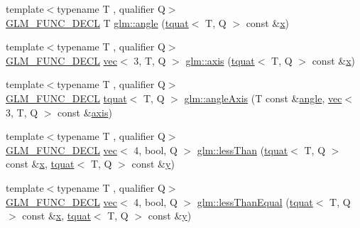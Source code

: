 \begin{DoxyCompactItemize}
\item 
{\footnotesize template$<$typename T , qualifier Q$>$ }\\\hyperlink{setup_8hpp_ab2d052de21a70539923e9bcbf6e83a51}{G\+L\+M\+\_\+\+F\+U\+N\+C\+\_\+\+D\+E\+CL} T \hyperlink{group__gtc__quaternion_gaaee6c856cae3217d274a240238cb6373}{glm\+::angle} (\hyperlink{structglm_1_1tquat}{tquat}$<$ T, Q $>$ const \&\hyperlink{_s_d_l__opengl_8h_ad0e63d0edcdbd3d79554076bf309fd47}{x})
\item 
{\footnotesize template$<$typename T , qualifier Q$>$ }\\\hyperlink{setup_8hpp_ab2d052de21a70539923e9bcbf6e83a51}{G\+L\+M\+\_\+\+F\+U\+N\+C\+\_\+\+D\+E\+CL} \hyperlink{structglm_1_1vec}{vec}$<$ 3, T, Q $>$ \hyperlink{group__gtc__quaternion_gaaf2707d3081789ce097daaa6e54d5287}{glm\+::axis} (\hyperlink{structglm_1_1tquat}{tquat}$<$ T, Q $>$ const \&\hyperlink{_s_d_l__opengl_8h_ad0e63d0edcdbd3d79554076bf309fd47}{x})
\item 
{\footnotesize template$<$typename T , qualifier Q$>$ }\\\hyperlink{setup_8hpp_ab2d052de21a70539923e9bcbf6e83a51}{G\+L\+M\+\_\+\+F\+U\+N\+C\+\_\+\+D\+E\+CL} \hyperlink{structglm_1_1tquat}{tquat}$<$ T, Q $>$ \hyperlink{group__gtc__quaternion_ga93856b8bfcdd5b9a164248df3149476c}{glm\+::angle\+Axis} (T const \&\hyperlink{_s_d_l__opengl__glext_8h_a9e06c1f76a20fed54ca742cd25cb02c4}{angle}, \hyperlink{structglm_1_1vec}{vec}$<$ 3, T, Q $>$ const \&\hyperlink{group__gtc__quaternion_gaaf2707d3081789ce097daaa6e54d5287}{axis})
\item 
{\footnotesize template$<$typename T , qualifier Q$>$ }\\\hyperlink{setup_8hpp_ab2d052de21a70539923e9bcbf6e83a51}{G\+L\+M\+\_\+\+F\+U\+N\+C\+\_\+\+D\+E\+CL} \hyperlink{structglm_1_1vec}{vec}$<$ 4, bool, Q $>$ \hyperlink{group__gtc__quaternion_ga627487c769e33f4b9f318f271b75802c}{glm\+::less\+Than} (\hyperlink{structglm_1_1tquat}{tquat}$<$ T, Q $>$ const \&\hyperlink{_s_d_l__opengl_8h_ad0e63d0edcdbd3d79554076bf309fd47}{x}, \hyperlink{structglm_1_1tquat}{tquat}$<$ T, Q $>$ const \&\hyperlink{_s_d_l__opengl_8h_a1675d9d7bb68e1657ff028643b4037e3}{y})
\item 
{\footnotesize template$<$typename T , qualifier Q$>$ }\\\hyperlink{setup_8hpp_ab2d052de21a70539923e9bcbf6e83a51}{G\+L\+M\+\_\+\+F\+U\+N\+C\+\_\+\+D\+E\+CL} \hyperlink{structglm_1_1vec}{vec}$<$ 4, bool, Q $>$ \hyperlink{group__gtc__quaternion_ga9e84617bb109bf2eb7f30d7f4ba07ad4}{glm\+::less\+Than\+Equal} (\hyperlink{structglm_1_1tquat}{tquat}$<$ T, Q $>$ const \&\hyperlink{_s_d_l__opengl_8h_ad0e63d0edcdbd3d79554076bf309fd47}{x}, \hyperlink{structglm_1_1tquat}{tquat}$<$ T, Q $>$ const \&\hyperlink{_s_d_l__opengl_8h_a1675d9d7bb68e1657ff028643b4037e3}{y})

\end{DoxyCompactItemize}
